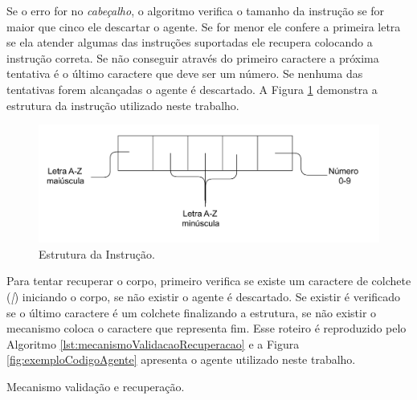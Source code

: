 Se o erro for no \emph{cabeçalho}, o algoritmo verifica o tamanho da instrução se for maior que cinco ele descartar o agente. Se for menor ele confere a primeira letra se ela atender algumas das instruções suportadas ele recupera colocando a instrução correta. Se não conseguir através do primeiro caractere a próxima tentativa é o último caractere que deve ser um número. Se nenhuma das tentativas forem alcançadas o agente é descartado. A Figura \ref{fig:estruturaInstrucao} demonstra a estrutura da instrução utilizado neste trabalho.

\begin{figure}[htbp]
	\centering
	\includegraphics[scale=0.27]{metodologia/figuras/estruturaInstrucao.pdf}
	\caption{Estrutura da Instrução.}
	\label{fig:estruturaInstrucao}
\end{figure}

Para tentar recuperar o corpo, primeiro verifica se existe um caractere de colchete (\emph{[}) iniciando o corpo, se não existir o agente é descartado. Se existir é verificado se o último caractere é um colchete finalizando a estrutura, se não existir o mecanismo coloca o caractere que representa fim. Esse roteiro é reproduzido pelo Algoritmo \ref{lst:mecanismoValidacaoRecuperacao} e a Figura \ref{fig:exemploCodigoAgente} apresenta o agente utilizado neste trabalho.

\begin{algorithm}
	\scriptsize
	\Inicio{
		\Entrada{Agente}
		$instrucoes = agente.pegarInstrucoes()$\;
		$i \gets 0$\;

		\uIf{agente.contem([)}{
			\Repita{$i < instrucoes.quantidade$}{
				$instrucao \gets instrucao[i]$ \;
				\uIf{$instrucao.tamanho < 5$}{
					\uIf{verificar(instrucao.primeiroCaracter)}{
						$instrucao \gets recuperar(instrucao.primeiroCaracter)$\;
					}
					\Else{
						\uIf(verficar(instrucao.ultimoCaracter)){
							$instrucao \gets recuperar(instrucao.ultimoCaracter)$\;
						}
						\Else{
							agente.remover()\;
						}
					}
					
				}
				\Else{
					agente.remover()\;
				}
				i++\;
			}
			\uIf{$agente.ultimoCaracter \neq ]$}{
				$agente.ultimoCaracter \gets ]$
			}
		}
		\Else{
			agente.remover()\;
		}
	}

		
	\caption{Mecanismo validação e recuperação.}
	\label{lst:mecanismoValidacaoRecuperacao}
\end{algorithm}

